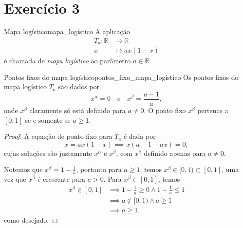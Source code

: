 \section*{Exercício 3}
\begin{definition}{Mapa logístico}{mapa_logístico}
    A aplicação
    \begin{align*}
        T_a : \mathbb{R} &\to \mathbb{R}\\
                       x &\mapsto ax(1 - x)
    \end{align*}
    é chamada de \emph{mapa logístico} ao parâmetro \(a \in \mathbb{R}\).
\end{definition}

\begin{proposition}{Pontos fixos do mapa logístico}{pontos_fixo_mapa_logístico}
    Os pontos fixos do mapa logístico \(T_a\) são dados por
    \begin{equation*}
        x^\alpha = 0 \quad\text{e}\quad x^\beta = \frac{a-1}{a},
    \end{equation*}
    onde \(x^\beta\) claramente só está definido para \(a \neq 0\). O ponto fixo \(x^\beta\) pertence a \([0,1]\) se e somente se \(a \geq 1\).
\end{proposition}
\begin{proof}
    A equação de ponto fixo para \(T_a\) é dada por
    \begin{equation*}
        x = ax(1 - x) \implies x(a - 1 - ax) = 0,
    \end{equation*}
    cujas soluções são justamente \(x^\alpha\) e \(x^\beta\), com \(x^\beta\) definido apenas para \(a \neq 0\).

    Notemos que \(x^\beta = 1 - \frac1a\), portanto para \(a \geq 1\), temos \(x^\beta \in [0,1) \subset [0,1]\), uma vez que \(x^\beta\) é crescente para \(a > 0\). Para \(x^\beta \in [0,1]\), temos
    \begin{align*}
        x^\beta \in [0,1] &\implies 1 - \frac{1}{a} \geq 0 \land 1 - \frac{1}{a} \leq 1\\
                          &\implies a \notin [0, 1) \land a \geq 1\\
                          &\implies a \geq 1,
    \end{align*}
    como desejado.
\end{proof}

